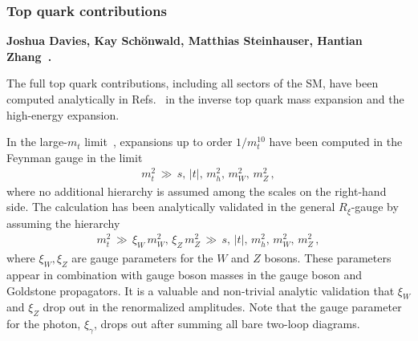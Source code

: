 \subsubsection{Top quark contributions}

\label{EW:top}

\noindent \textbf{Joshua Davies, Kay Schönwald, Matthias Steinhauser, Hantian Zhang~\cite{Davies:2023npk,Davies:2026wbx}.}

\noindent The full top quark contributions, including all sectors of the SM, have been computed analytically in
Refs.~\cite{Davies:2023npk,Davies:2026wbx} in the inverse top quark mass expansion and the high-energy expansion.

In the large-$m_t$ limit~\cite{Davies:2023npk}, expansions up to order $1/m_t^{10}$ have been computed in the Feynman gauge in the limit
\begin{align}
m_t^2 \, \gg \, s, \, |t|, \, m_h^2, \, m_W^2 , \, m_Z^2 \,,
\end{align}
where no additional hierarchy is assumed among the scales on the right-hand side.
%
The calculation has been analytically validated in the general $R_\xi$-gauge by assuming the hierarchy
\begin{align}
    m_t^2 \, \gg \, \xi_W \, m_W^2, \, \xi_Z \, m_Z^2  \, \gg \, s, \, |t|, \, m_h^2, \, m_W^2 , \, m_Z^2 \,,
\end{align}
where $\xi_W, \xi_Z$ are gauge parameters for the $W$ and $Z$ bosons.
%
These parameters appear in combination with gauge boson masses in the gauge boson and Goldstone propagators.
%
It is a valuable and non-trivial analytic validation that $\xi_W$ and $\xi_Z$ drop out in the renormalized amplitudes. 
%
Note that the gauge parameter for the photon, $\xi_\gamma$, drops out after summing all bare two-loop diagrams.
%


